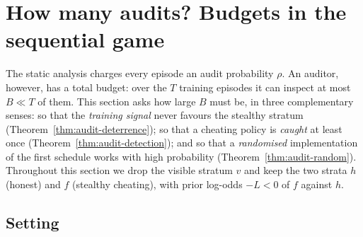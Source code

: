 \section{How many audits? Budgets in the sequential game}
\label{sec:audit-budget}

The static analysis charges every episode an audit probability $\rho$. An
auditor, however, has a total budget: over the $T$ training episodes it can
inspect at most $B\ll T$ of them. This section asks how large $B$ must be, in
three complementary senses: so that the \emph{training signal} never favours
the stealthy stratum (Theorem~\ref{thm:audit-deterrence}); so that a cheating
policy is \emph{caught} at least once
(Theorem~\ref{thm:audit-detection}); and so that a \emph{randomised}
implementation of the first schedule works with high probability
(Theorem~\ref{thm:audit-random}). Throughout this section we drop the visible
stratum $v$ and keep the two strata $h$ (honest) and $f$ (stealthy cheating),
with prior log-odds $-L<0$ of $f$ against $h$.

\subsection{Setting}

